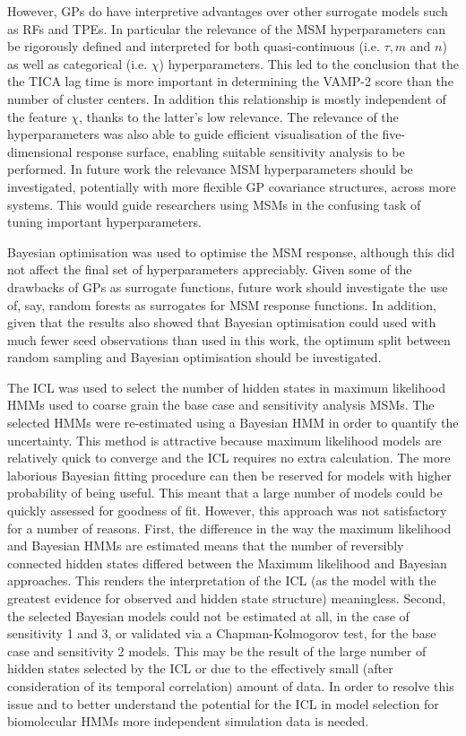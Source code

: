 However, GPs do have interpretive advantages over other surrogate models such as RFs and TPEs. In particular the relevance of the MSM hyperparameters can be rigorously defined and interpreted for both quasi-continuous (i.e. $\tau, m$ and $n$) as well as categorical (i.e. $\chi$) hyperparameters. This led to the conclusion that the the TICA lag time is more important in determining the VAMP-2 score than the number of cluster centers. In addition this relationship is mostly independent of the feature $\chi$, thanks to the latter's low relevance. The relevance of the hyperparameters was also able to guide efficient visualisation of the five-dimensional response surface, enabling suitable sensitivity analysis to be performed. In future work the relevance MSM hyperparameters should be investigated, potentially with more flexible GP covariance structures, across more systems. This would guide researchers using MSMs in the confusing task of tuning important hyperparameters. 

Bayesian optimisation was used to optimise the MSM response, although this did not affect the final set of hyperparameters appreciably. Given some of the drawbacks of GPs as surrogate functions, future work should investigate the use of, say, random forests  as surrogates for MSM response functions. In addition, given that the results also showed that Bayesian optimisation could used with much fewer seed observations than used in this work, the optimum split between random sampling and Bayesian optimisation should be investigated.

The ICL was used to select the number of hidden states in maximum likelihood HMMs used to coarse grain the base case and sensitivity analysis MSMs. The selected HMMs were re-estimated using a Bayesian HMM in order to quantify the uncertainty. This method is attractive because maximum likelihood models are relatively quick to converge and the ICL requires no extra calculation. The more laborious Bayesian fitting procedure can then be reserved for models with higher probability of being useful. This meant that a large number of models could be quickly assessed for goodness of fit. However, this approach was not satisfactory for a number of reasons. First, the difference in the way the maximum likelihood and Bayesian HMMs are estimated means that the number of reversibly connected hidden states differed between the Maximum likelihood and Bayesian approaches. This renders the interpretation of the ICL (as the model with the greatest evidence for observed and hidden state structure) meaningless. Second, the selected Bayesian models could not be estimated at all, in the case of sensitivity 1 and 3, or validated via a Chapman-Kolmogorov test, for the base case and sensitivity 2 models. This may be the result of the large number of hidden states selected by the ICL or due to the effectively small (after consideration of its temporal correlation) amount of data. In order to resolve this issue and to better understand the potential for the ICL in model selection for biomolecular HMMs more independent simulation data is needed. 

